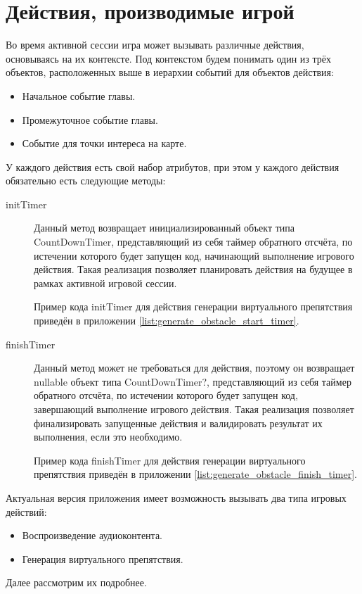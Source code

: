 \section{Действия, производимые игрой}
\label{sec:actions}
Во время активной сессии игра может вызывать различные действия, основываясь на их контексте. Под контекстом будем понимать один из трёх объектов, расположенных выше в иерархии событий для объектов действия:
\begin{itemize}
	\item Начальное событие главы.
	\item Промежуточное событие главы.
	\item Событие для точки интереса на карте.
\end{itemize}
\smallskip

У каждого действия есть свой набор атрибутов, при этом у каждого действия обязательно есть следующие методы:
\begin{description}
	\item[initTimer] Данный метод возвращает инициализированный объект типа CountDownTimer, представляющий из себя таймер обратного отсчёта, по истечении которого будет запущен код, начинающий выполнение игрового действия. Такая реализация позволяет планировать действия на будущее в рамках активной игровой сессии.
	
	Пример кода initTimer для действия генерации виртуального препятствия приведён в приложении \ref{list:generate_obstacle_start_timer}.
	\item[finishTimer] Данный метод может не требоваться для действия, поэтому он возвращает  nullable объект типа CountDownTimer?, представляющий из себя таймер обратного отсчёта, по истечении которого будет запущен код, завершающий выполнение игрового действия. Такая реализация позволяет финализировать запущенные действия и валидировать результат их выполнения, если это необходимо.
	
	Пример кода finishTimer для действия генерации виртуального препятствия приведён в приложении \ref{list:generate_obstacle_finish_timer}.
\end{description}
\smallskip
Актуальная версия приложения имеет возможность вызывать два типа игровых действий:
\begin{itemize}
	\item Воспроизведение аудиоконтента.
	\item Генерация виртуального препятствия.
\end{itemize}
\smallskip
Далее рассмотрим их подробнее.


